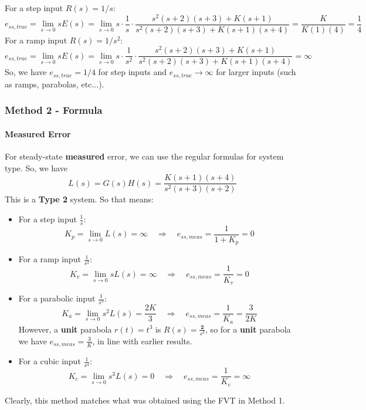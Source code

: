 \documentclass{book}
\begin{document}
\noindent For a step input $ R(s) = 1/s $:
\[ e_{ss,true} = \lim_{s\to0} sE(s) = \lim_{s\to0} s\cdot\frac{1}{s}\cdot \frac{s^2(s+2)(s+3)+K(s+1)}{s^2(s+2)(s+3)+K(s+1)(s+4)} = \frac{K}{K(1)(4)} = \frac{1}{4} \]
For a ramp input $ R(s) = 1/s^2 $:
\[ e_{ss,true} = \lim_{s\to0} sE(s) = \lim_{s\to0} s\cdot\frac{1}{s^2}\cdot \frac{s^2(s+2)(s+3)+K(s+1)}{s^2(s+2)(s+3)+K(s+1)(s+4)} = \infty \]
So, we have $ e_{ss,true} = 1/4 $ for step inputs and $ e_{ss,true}\to\infty $ for larger inputs (such as ramps, parabolas, etc...).

\subsubsection*{Method 2 - Formula}
\paragraph*{Measured Error} For steady-state \textbf{measured} error, we can use the regular formulas for system type. So, we have
\[ L(s) = G(s)H(s) = \frac{K(s+1)(s+4)}{s^2(s+3)(s+2)} \]
This is a \textbf{Type 2} system. So that means:
\begin{itemize}
	\item For a step input $\frac{1}{s} $:
	\[ K_p = \lim_{s\to 0} L(s) = \infty \quad\Rightarrow\quad e_{ss,meas} = \frac{1}{1+K_p} = 0 \]
	\item For a ramp input $ \frac{1}{s^2} $:
	\[ K_v = \lim_{s\to 0} sL(s) = \infty \quad\Rightarrow\quad e_{ss,meas} = \frac{1}{K_v} = 0 \]
	\item For a parabolic input $ \frac{1}{s^3} $:
	\[ K_a = \lim_{s\to 0} s^2L(s) = \frac{2K}{3} \quad\Rightarrow\quad e_{ss,meas} = \frac{1}{K_a} = \frac{3}{2K} \]
	However, a \textbf{unit} parabola $ r(t) = t^3 $ is $ R(s) = \frac{\mathbf{2}}{s^3} $, so for a \textbf{unit} parabola we have $ e_{ss,meas} = \frac{3}{K} $, in line with earlier results.
	\item For a cubic input  $ \frac{1}{s^4} $:
	\[ K_c = \lim_{s\to 0} s^3L(s) = 0 \quad\Rightarrow\quad e_{ss,meas} = \frac{1}{K_c} = \infty \]
\end{itemize}
Clearly, this method matches what was obtained using the FVT in Method 1.
\end{document}
